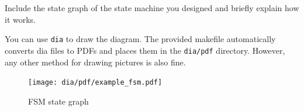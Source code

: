 \documentclass[10pt,a4paper,titlepage,oneside]{article}
\begin{document}

\begin{qa}{Include the state graph of the state machine you designed and briefly explain how it works.}

You can use \texttt{dia} to draw the diagram. The provided makefile automatically converts dia files to PDFs and places them in the \texttt{dia/pdf} directory.
However, any other method for drawing pictures is also fine. 

\begin{figure}[h!]
	\centering
	\texttt{[image: dia/pdf/example\_fsm.pdf]}
	\caption{FSM state graph}
\end{figure}

\end{qa}
\end{document}
